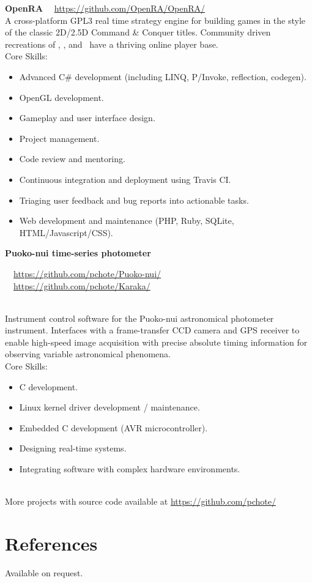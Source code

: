 \documentclass[print]{cv-style}
\begin{document}

\parbox[t]{12.8cm}{%
    \textbf{OpenRA}%
    \hfill%
    {\small\color{lightgray} \faGithub~~\url{https://github.com/OpenRA/OpenRA/}}\\%
    A cross-platform GPL3 real time strategy engine for building games in the style of the classic 2D/2.5D Command \& Conquer titles.  Community driven recreations of , , and ~have a thriving online player base.
    \vspace{\parsep}\\
    Core Skills:
    \begin{itemize}
        \item Advanced C\# development (including LINQ, P/Invoke, reflection, codegen).
        \item OpenGL development.
        \item Gameplay and user interface design.
        \item Project management.
        \item Code review and mentoring.
        \item Continuous integration and deployment using Travis CI.
        \item Triaging user feedback and bug reports into actionable tasks.
        \item Web development and maintenance (PHP, Ruby, SQLite, HTML/Javascript/CSS).
    \end{itemize}
}


\parbox[t]{12.8cm}{%
    \textbf{Puoko-nui time-series photometer}%
    \hfill{\small\color{lightgray} \parbox{6.4cm}{\faGithub~~\url{https://github.com/pchote/Puoko-nui/} \\ \faGithub~~\url{https://github.com/pchote/Karaka/}}}\\%
    Instrument control software for the Puoko-nui astronomical photometer instrument.  Interfaces with a frame-transfer CCD camera and GPS receiver to enable high-speed image acquisition with precise absolute timing information for observing variable astronomical phenomena.
    \vspace{\parsep}\\
    Core Skills:
    \begin{itemize}
      \item C development.
      \item Linux kernel driver development / maintenance.
      \item Embedded C development (AVR microcontroller).
      \item Designing real-time systems.
      \item Integrating software with complex hardware environments.
    \end{itemize}
}\\

{More projects with source code available at \url{https://github.com/pchote/}\vspace{5mm}}\\
\vspace{-0.5cm}
\section{References}
{\small Available on request.}
\end{document}
